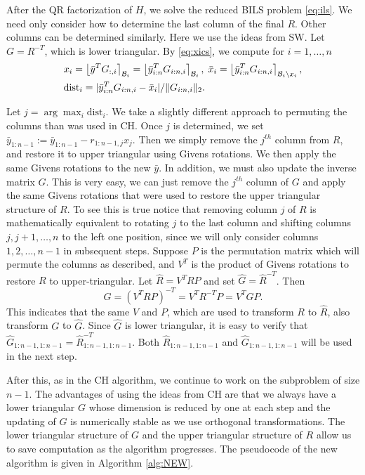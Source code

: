 \documentclass[12pt,Bold,letterpaper]{mcgilletdclass}
\newcommand{\dist}{\mathrm{dist}}
\begin{document}
After the QR factorization of $H$, we  solve the reduced BILS problem \eqref{eq:ils}.
We need only consider how to determine the last column of the final $R$.
Other columns can be determined similarly. 
Here we use the ideas from SW.
Let $G=R^{-T}$, which is lower triangular.
By \eqref{eq:xics}, we compute for $i=1,\ldots, n$
\begin{align*}
& x_i = \left \lfloor \bar{y}^TG_{:,i} \right \rceil_{{\cal B}_i} 
=\left \lfloor \bar{y}_{i:n}^T G_{i:n,i} \right \rceil_{{\cal B}_i}, \;
\bar{x}_i=\left \lfloor \bar{y}_{i:n}^T G_{i:n,i} \right \rceil_{{\cal B}_i\backslash x_i}, \\
& \dist_i = |\bar{y}_{i:n}^T G_{i:n,i}-\bar{x}_i|/\|G_{i:n,i}\|_2.
\end{align*}

Let $j=\arg\max_{i} \dist_i$. We  take a slightly different approach to
permuting the columns than was used in CH. Once $j$ is determined, we  
set $\bar{y}_{1:n-1} := \bar{y}_{1:n-1} - r_{1:n-1,j}x_j$. Then we simply remove
the $j^{th}$ column from $R$, and restore it to upper triangular using
Givens rotations. We then apply the same Givens rotations to the new
$\bar{y}$. In addition, we must also update the inverse matrix $G$. This is
very easy, we can just remove the $j^{th}$ column of $G$ and apply the same
Givens rotations that were used to restore the upper triangular structure of
$R$. To see this is true notice that removing column $j$ of $R$ is
mathematically equivalent to rotating $j$ to the last column and shifting
columns $j, j+1, \ldots, n$ to the left one position, since we will only consider columns
$1, 2, \ldots, n-1$ in subsequent steps. Suppose $P$ is the permutation matrix which
will permute the columns as described, and $V^T$ is the product of Givens
rotations to restore $R$ to upper-triangular. Let $\hat{R} = V^TRP$ and set
$\hat{G} = \hat{R}^{-T}$. Then
$$
\hat{G} = (V^TRP)^{-T} = V^TR^{-T}P = V^TGP.
$$
This indicates that  the same $V$ and $P$, which are used to transform $R$ to  $\hat{R}$, 
also transform $G$ to $\hat{G}$.
Since $\hat{G}$ is lower triangular, it is easy to verify that
$\hat{G}_{1:n-1,1:n-1} = \hat{R}^{-T}_{1:n-1,1:n-1}$.
Both $\hat{R}_{1:n-1,1:n-1}$ and $\hat{G}_{1:n-1,1:n-1}$ will be used in the next step.

After this, as in the CH algorithm, we continue to work on the subproblem of size $n-1$. 
The advantages of using the ideas from CH are that we always have a lower triangular $G$
whose dimension is reduced by one at each step
and the updating of $G$ is numerically stable as we use orthogonal transformations. The lower triangular structure of $G$ and the upper triangular structure of $R$ allow us to save computation as the algorithm progresses.
The pseudocode of the new algorithm is given in Algorithm  \ref{alg:NEW}.
\end{document}
